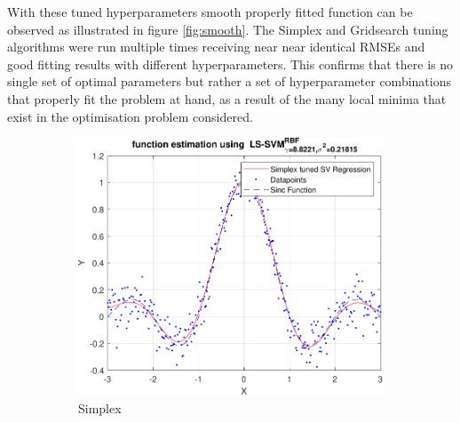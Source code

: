 \documentclass{article}
\begin{document}
            With these tuned hyperparameters smooth properly fitted function can be observed as illustrated in figure \ref{fig:smooth}.
            The Simplex and Gridsearch tuning algorithms were run multiple times receiving near near identical RMSEs and good fitting results with different hyperparameters. This confirms that there is no single set of optimal parameters but rather a set of hyperparameter combinations that properly fit the problem at hand, as a result of the many local minima that exist in the optimisation problem considered. 
            \begin{figure}[h]
                 \centering
                 \hspace{0.05\textwidth}
                 \begin{subfigure}[b]{0.4\textwidth}
                     \centering
                     \includegraphics[width=\textwidth]{Assignment 2/figures/1_2/rbf_tuning_results_simp.pdf}
                     \caption{Simplex}
                     \label{fig:regression_simplex_tuned}
                 \end{subfigure}
                 \hfill
                 \begin{subfigure}[b]{0.4\textwidth}
                     \centering

\end{subfigure}
\end{figure}
\end{document}
